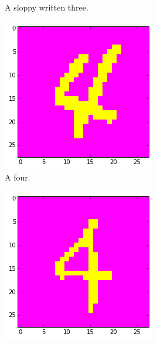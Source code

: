\documentclass[a4paper,10pt]{article}
\numberwithin{equation}{section} %
\numberwithin{figure}{section} %
\numberwithin{table}{section} %
\theoremstyle{mytheor}
\begin{document}
\begin{enumerate}
\begin{figure}[h!]
\begin{subfigure}[b]{0.26\textwidth}
				\caption{A sloppy written three.}
			\end{subfigure}
			\begin{subfigure}[b]{0.26\textwidth}
				\includegraphics[width=\textwidth]{digits/via.png}\vspace{-0.4cm}
				\caption{A four.}
			\end{subfigure}
			\begin{subfigure}[b]{0.26\textwidth}
				\includegraphics[width=\textwidth]{digits/dichtvier.png}\vspace{-0.4cm}

\end{subfigure}
\end{figure}
\end{enumerate}
\end{document}
